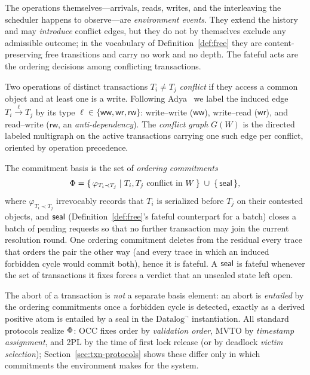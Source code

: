 The operations themselves---arrivals, reads, writes, and the interleaving the
scheduler happens to observe---are \emph{environment events}. They extend the
history and may \emph{introduce} conflict edges, but they do not by themselves
exclude any admissible outcome; in the vocabulary of
Definition~\ref{def:free} they are content-preserving free transitions and
carry no work and no depth. The fateful acts are the ordering decisions among
conflicting transactions.

\begin{definition}
  \label{def:txn-conflict}
  Two operations of distinct transactions $T_i \neq T_j$ \emph{conflict} if
  they access a common object and at least one is a write. Following
  Adya~\cite{adya1999weak} we label the induced edge
  $T_i \xrightarrow{\ell} T_j$ by its type
  $\ell \in \{\mathsf{ww}, \mathsf{wr}, \mathsf{rw}\}$: write--write
  ($\mathsf{ww}$), write--read ($\mathsf{wr}$), and read--write
  ($\mathsf{rw}$, an \emph{anti-dependency}). The \emph{conflict graph}
  $G(W)$ is the directed labeled multigraph on the active transactions carrying
  one such edge per conflict, oriented by operation precedence.
\end{definition}

\begin{definition}
  \label{def:txn-basis}
  The commitment basis is the set of \emph{ordering commitments}
  \[
    \Phi = \{\,\varphi_{T_i \prec T_j} \mid T_i, T_j \text{ conflict in } W\,\}
      \;\cup\; \{\,\mathsf{seal}\,\},
  \]
  where $\varphi_{T_i \prec T_j}$ irrevocably records that $T_i$ is serialized
  before $T_j$ on their contested objects, and $\mathsf{seal}$ (Definition~\ref{def:free}'s
  fateful counterpart for a batch) closes a batch of pending requests so that no
  further transaction may join the current resolution round. One ordering
  commitment deletes from the residual every trace that orders the pair the
  other way (and every trace in which an induced forbidden cycle would commit
  both), hence it is fateful. A $\mathsf{seal}$ is fateful whenever the set of
  transactions it fixes forces a verdict that an unsealed state left open.
\end{definition}

\noindent
The abort of a transaction is \emph{not} a separate basis element: an abort is
\emph{entailed} by the ordering commitments once a forbidden cycle is detected,
exactly as a derived positive atom is entailed by a seal in the
$\mbox{Datalog}^\neg$ instantiation. All standard protocols realize $\Phi$:
OCC fixes order by \emph{validation order}, MVTO by \emph{timestamp
assignment}, and 2PL by the time of first lock release (or by deadlock
\emph{victim selection}); Section~\ref{sec:txn-protocols} shows these differ
only in which commitments the environment makes for the system.

